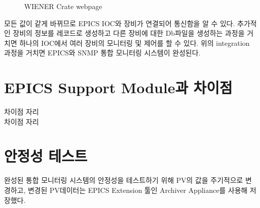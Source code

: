 \documentclass[11pt
  , a4paper
  , article
  , oneside
]{memoir}
\begin{document}
\begin{figure}[!h]
  \centering
              \hfill
              \hfill
  \caption
      {
WIENER Crate webpage
      }
 \label{fig:wienerweb}
\end{figure}

모든 값이 같게 바뀌므로 EPICS IOC와 장비가 연결되어 통신함을 알 수 있다. 추가적인 장비의 정보를 레코드로 생성하고 다른 장비에 대한 Db파일을 생성하는 과정을 거치면 하나의 IOC에서 여러 장비의 모니터링 및 제어를 할 수 있다. 위의 integration 과정을 거치면 EPICS와 SNMP 통합 모니터링 시스템이 완성된다.

\section{EPICS Support Module과 차이점}
차이점 자리\\
차이점 자리\\

\section{안정성 테스트}
완성된 통합 모니터링 시스템의 안정성을 테스트하기 위해 PV의 값을 주기적으로 변경하고, 변경된 PV데이터는 EPICS Extension 툴인 Archiver Appliance를 사용해 저장했다.
\end{document}
